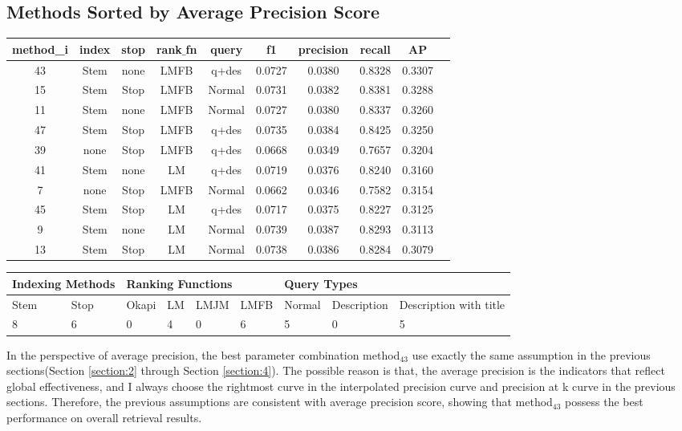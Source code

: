 \documentclass[10pt, a4paper]{article}
\begin{document}
\subsection{Methods Sorted by Average Precision Score}
\begin{center}
\begin{tabular}{ |c|c|c|c|c|c|c|c|c|c| } 
\hline
method_i  & index & stop & rank$\_$fn & query & f1 & precision & recall & AP \\
\hline
 43 & Stem & none & LMFB &  q+des & 0.0727 &  0.0380 & 0.8328 & 0.3307  \\
 15 & Stem & Stop & LMFB & Normal & 0.0731 &  0.0382 & 0.8381 & 0.3288  \\
 11 & Stem & none & LMFB & Normal & 0.0727 &  0.0380 & 0.8337 & 0.3260  \\
 47 & Stem & Stop & LMFB &  q+des & 0.0735 &  0.0384 & 0.8425 & 0.3250 \\
 39 & none & Stop & LMFB &  q+des & 0.0668 &  0.0349 & 0.7657 & 0.3204  \\
 41 & Stem & none & LM &  q+des & 0.0719 &  0.0376 & 0.8240 & 0.3160  \\
7 & none & Stop & LMFB & Normal & 0.0662 &  0.0346 & 0.7582 & 0.3154 \\
 45 & Stem & Stop & LM &  q+des & 0.0717 &  0.0375 & 0.8227 & 0.3125  \\
9 & Stem & none & LM & Normal & 0.0739 &  0.0387 & 0.8293 & 0.3113 \\
 13 & Stem & Stop & LM & Normal & 0.0738 &  0.0386 & 0.8284 & 0.3079  \\
\hline
\end{tabular}
\end{center}

\begin{center}
\begin{tabular}{|l|l|l|l|l|l|l|l|l|}
\hline
\multicolumn{2}{|l|}{Indexing Methods} & \multicolumn{4}{l|}{Ranking Functions} & \multicolumn{3}{l|}{Query Types}              \\ \hline
Stem               & Stop              & Okapi     & LM     & LMJM    & LMFB    & Normal & Description & Description with title \\ \hline
8                  & 6                 & 0         & 4      & 0       & 6       & 5      & 0           & 5                      \\ \hline
\end{tabular}
\end{center}

In the perspective of average precision, the best parameter combination method$_{43}$ use exactly the same assumption in the previous sections(Section \ref{section:2} through Section \ref{section:4}). The possible reason is that, the average precision is the indicators that reflect global effectiveness, and I always choose the rightmost curve in the interpolated precision curve and precision at k curve in the previous sections. Therefore, the previous assumptions are consistent with average precision score, showing that method$_{43}$ possess the best performance on overall retrieval results.
\end{document}

